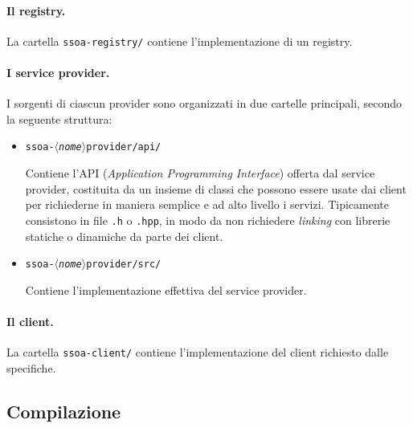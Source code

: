 \documentclass[a4paper,twoside]{article}
\newcommand*\file{\texttt}
\newcommand*\meta[1]{$\langle$\emph{#1}$\rangle$}
\begin{document}
\paragraph{Il registry.}
La cartella \file{ssoa-registry/} contiene l'implementazione di un registry.

\paragraph{I service provider.}
I sorgenti di ciascun provider sono organizzati in due cartelle principali, secondo la seguente struttura:
\begin{itemize}
\item \file{ssoa-\meta{nome}provider/api/}\par
Contiene l'API (\emph{Application Programming Interface}) offerta dal service provider, costituita da un insieme di classi che possono essere usate dai client per richiederne in maniera semplice e ad alto livello i servizi. Tipicamente consistono in file \file{.h} o \file{.hpp}, in modo da non richiedere \emph{linking} con librerie statiche o dinamiche da parte dei client.
\item \file{ssoa-\meta{nome}provider/src/}\par
Contiene l'implementazione effettiva del service provider.
\end{itemize}

\paragraph{Il client.}
La cartella \file{ssoa-client/} contiene l'implementazione del client richiesto dalle specifiche.


\subsection{Compilazione}
\end{document}
